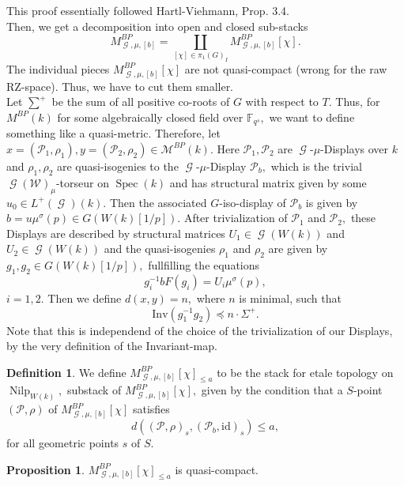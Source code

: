 \documentclass[a4paper,11,5 pt]{amsart}
\theoremstyle{definition}
\newtheorem{Definition}{Definition}
\newtheorem{proposition}[Satz]{Proposition}
\DeclareMathOperator{\Spec}{Spec}
\DeclareMathOperator{\Nilp}{Nilp}
\DeclareMathOperator{\G}{\mathcal{G}}
\begin{document}
This proof essentially followed Hartl-Viehmann, Prop. 3.4.
\\
Then, we get a decomposition into open and closed sub-stacks
$$
M^{BP}_{\G,\mu,[b]}=\coprod_{[\chi]\in \pi_{1}(G)_{I}} M^{BP}_{\G,\mu,[b]}[\chi].
$$
The individual pieces $M^{BP}_{\G,\mu,[b]}[\chi]$ are not quasi-compact (wrong for the raw RZ-space). Thus, we have to cut them smaller.
\\
Let $\sum^{+}$ be the sum of all positive co-roots of $G$ with respect to $T.$ 
Thus, for $M^{BP}(k)$ for some algebraically closed field over $\mathbb{F}_{q^{s}},$ we want to define something like a quasi-metric. Therefore, let $x=(\mathcal{P}_{1},\rho_{1}),y=(\mathcal{P}_{2},\rho_{2})\in \mathcal{M}^{BP}(k).$ Here $\mathcal{P}_{1}, \mathcal{P}_{2}$ are $\G$-$\mu$-Displays over $k$ and $\rho_{1},\rho_{2}$ are quasi-isogenies to the $\G$-$\mu$-Display $\mathcal{P}_{b},$ which is the trivial $\G(\mathcal{W})_{\mu}$-torseur on $\Spec(k)$ and has structural matrix given by some $u_{0}\in L^{+}(\G)(k).$ Then the associated $G$-iso-display of $\mathcal{P}_{b}$ is given by $b=u\mu^{\sigma}(p)\in G(W(k)[1/p]).$ After trivialization of $\mathcal{P}_{1}$ and $\mathcal{P}_{2},$ these Displays are described by structural matrices $U_{1}\in \G(W(k))$ and $U_{2}\in \G(W(k))$ and the quasi-isogenies $\rho_{1}$ and $\rho_{2}$ are given by $g_{1},g_{2}\in G(W(k)[1/p]),$ fullfilling the equations
\begin{equation}
g_{i}^{-1}bF(g_{i})=U_{i}\mu^{\sigma}(p),
\end{equation}
$i=1,2.$ Then we define $d(x,y)=n,$ where $n$ is minimal, such that
$$
\text{Inv}(g_{1}^{-1}g_{2}) \preceq n\cdot \Sigma^{+}.
$$
Note that this is independend of the choice of the trivialization of our Displays, by the very definition of the Invariant-map.
\begin{Definition}
We define $
M^{BP}_{\G,\mu,[b]}[\chi]_{\leq a}$ to be the stack for etale topology on $\Nilp_{W(k)},$ substack of $M^{BP}_{\G,\mu,[b]}[\chi],$ given by the condition that a $S$-point $(\mathcal{P},\rho)$ of $M^{BP}_{\G,\mu,[b]}[\chi]$ satisfies
$$
d((\mathcal{P},\rho)_{s},(\mathcal{P}_{b},\text{id})_{s})\leq a,
$$
for all geometric points $s$ of $S.$
\end{Definition}
\begin{proposition}
$
M^{BP}_{\G,\mu,[b]}[\chi]_{\leq a}$ is quasi-compact.
\end{proposition}
\end{document}
